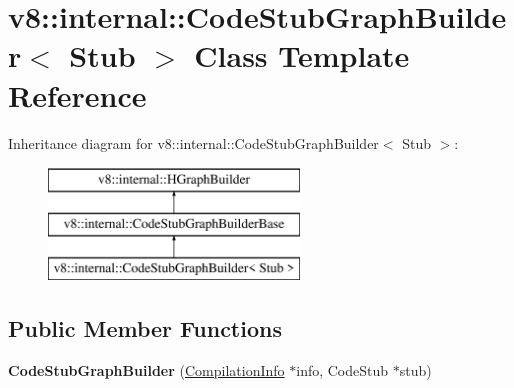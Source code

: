 \hypertarget{classv8_1_1internal_1_1_code_stub_graph_builder}{}\section{v8\+:\+:internal\+:\+:Code\+Stub\+Graph\+Builder$<$ Stub $>$ Class Template Reference}
\label{classv8_1_1internal_1_1_code_stub_graph_builder}
Inheritance diagram for v8\+:\+:internal\+:\+:Code\+Stub\+Graph\+Builder$<$ Stub $>$\+:\begin{figure}[H]
\begin{center}
\leavevmode
\includegraphics[height=3.000000cm]{classv8_1_1internal_1_1_code_stub_graph_builder}
\end{center}
\end{figure}
\subsection*{Public Member Functions}
\begin{DoxyCompactItemize}
\item 
{\bfseries Code\+Stub\+Graph\+Builder} (\hyperlink{classv8_1_1internal_1_1_compilation_info}{Compilation\+Info} $\ast$info, Code\+Stub $\ast$stub)\hypertarget{classv8_1_1internal_1_1_code_stub_graph_builder_ab72752c25ea0c26575908faacfa635c8}{}\label{classv8_1_1internal_1_1_code_stub_graph_builder_ab72752c25ea0c26575908faacfa635c8}

\end{DoxyCompactItemize}
